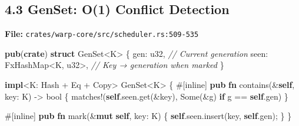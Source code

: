 \documentclass[
]{book}
\newenvironment{Shaded}{}{}
\newcommand{\AttributeTok}[1]{\textcolor[rgb]{0.49,0.56,0.16}{#1}}
\newcommand{\BuiltInTok}[1]{\textcolor[rgb]{0.00,0.50,0.00}{#1}}
\newcommand{\CommentTok}[1]{\textcolor[rgb]{0.38,0.63,0.69}{\textit{#1}}}
\newcommand{\ConstantTok}[1]{\textcolor[rgb]{0.53,0.00,0.00}{#1}}
\newcommand{\ControlFlowTok}[1]{\textcolor[rgb]{0.00,0.44,0.13}{\textbf{#1}}}
\newcommand{\DataTypeTok}[1]{\textcolor[rgb]{0.56,0.13,0.00}{#1}}
\newcommand{\KeywordTok}[1]{\textcolor[rgb]{0.00,0.44,0.13}{\textbf{#1}}}
\newcommand{\NormalTok}[1]{#1}
\newcommand{\OperatorTok}[1]{\textcolor[rgb]{0.40,0.40,0.40}{#1}}
\newcommand{\PreprocessorTok}[1]{\textcolor[rgb]{0.74,0.48,0.00}{#1}}
\begin{document}
\subsection{4.3 GenSet: O(1) Conflict
Detection}\label{genset-o1-conflict-detection}

\textbf{File:} \texttt{crates/warp-core/src/scheduler.rs:509-535}

\begin{Shaded}
\begin{Highlighting}[]
\KeywordTok{pub}\NormalTok{(}\KeywordTok{crate}\NormalTok{) }\KeywordTok{struct}\NormalTok{ GenSet}\OperatorTok{\textless{}}\NormalTok{K}\OperatorTok{\textgreater{}} \OperatorTok{\{}
\NormalTok{    gen}\OperatorTok{:} \DataTypeTok{u32}\OperatorTok{,}                    \CommentTok{// Current generation}
\NormalTok{    seen}\OperatorTok{:}\NormalTok{ FxHashMap}\OperatorTok{\textless{}}\NormalTok{K}\OperatorTok{,} \DataTypeTok{u32}\OperatorTok{\textgreater{},}     \CommentTok{// Key → generation when marked}
\OperatorTok{\}}

\KeywordTok{impl}\OperatorTok{\textless{}}\NormalTok{K}\OperatorTok{:} \BuiltInTok{Hash} \OperatorTok{+} \BuiltInTok{Eq} \OperatorTok{+} \BuiltInTok{Copy}\OperatorTok{\textgreater{}}\NormalTok{ GenSet}\OperatorTok{\textless{}}\NormalTok{K}\OperatorTok{\textgreater{}} \OperatorTok{\{}
    \AttributeTok{\#[}\NormalTok{inline}\AttributeTok{]}
    \KeywordTok{pub} \KeywordTok{fn}\NormalTok{ contains(}\OperatorTok{\&}\KeywordTok{self}\OperatorTok{,}\NormalTok{ key}\OperatorTok{:}\NormalTok{ K) }\OperatorTok{{-}\textgreater{}} \DataTypeTok{bool} \OperatorTok{\{}
        \PreprocessorTok{matches!}\NormalTok{(}\KeywordTok{self}\OperatorTok{.}\NormalTok{seen}\OperatorTok{.}\NormalTok{get(}\OperatorTok{\&}\NormalTok{key)}\OperatorTok{,} \ConstantTok{Some}\NormalTok{(}\OperatorTok{\&}\NormalTok{g) }\ControlFlowTok{if}\NormalTok{ g }\OperatorTok{==} \KeywordTok{self}\OperatorTok{.}\NormalTok{gen)}
    \OperatorTok{\}}

    \AttributeTok{\#[}\NormalTok{inline}\AttributeTok{]}
    \KeywordTok{pub} \KeywordTok{fn}\NormalTok{ mark(}\OperatorTok{\&}\KeywordTok{mut} \KeywordTok{self}\OperatorTok{,}\NormalTok{ key}\OperatorTok{:}\NormalTok{ K) }\OperatorTok{\{}
        \KeywordTok{self}\OperatorTok{.}\NormalTok{seen}\OperatorTok{.}\NormalTok{insert(key}\OperatorTok{,} \KeywordTok{self}\OperatorTok{.}\NormalTok{gen)}\OperatorTok{;}
    \OperatorTok{\}}
\OperatorTok{\}}
\end{Highlighting}
\end{Shaded}
\end{document}
